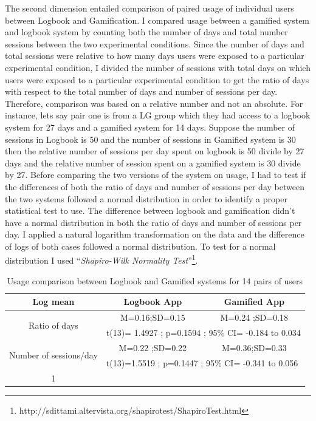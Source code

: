 The second dimension entailed comparison of paired usage of individual users between Logbook and Gamification. I compared usage between a gamified system and logbook system by counting both the number of days and total number sessions between the two experimental conditions. Since the number of days and total sessions were relative to how many days users were exposed to a particular experimental condition, I divided the number of sessions with total days on which users were exposed to a particular experimental condition to get the ratio of days with respect to the total number of days and number of sessions per day. Therefore, comparison was based on a relative number and not an absolute. For instance, lets say pair one is from a LG group which they had access to a logbook system for 27 days and a gamified system for 14 days. Suppose the number of sessions in Logbook is 50 and the number of sessions in Gamified system is 30 then the relative number of sessions per day spent on logbook is 50 divide by 27 days and the relative number of session spent on  a gamified system is 30 divide by 27. Before comparing the two versions of the system on usage, I had to test if the differences of both the ratio of days and number of sessions per day between the two systems followed a normal distribution in order to identify a proper statistical test to use. The difference between logbook and gamification didn't have a normal distribution in both the ratio of days and number of sessions per day. I applied a natural logarithm transformation on the data and the difference of logs of both cases followed a normal distribution. To test for a normal distribution I used ``\emph{Shapiro-Wilk Normality Test}''\footnote{http://sdittami.altervista.org/shapirotest/ShapiroTest.html}.
\newline 
\begin{table}[h!]
  \begin{center}
    \caption{Usage comparison between Logbook and Gamified systems for 14 pairs of users}
    \label{table:usagewellness1}
	\begin{tabular}{|c|c|c|}
		\hline
		Log mean &Logbook App&Gamified App\\
		\hline
		 \multirow{2}{*}{Ratio of days}&M=0.16;SD=0.15&M=0.24 ;SD=0.18\\\cline{2-3} 

		 &\multicolumn{2}{|l|}{t(13)= 1.4927 ; p=0.1594 ; 95\% CI= -0.184 to 0.034} \\
\hline
   		 \multirow{2}{*}{ Number of sessions/day}&M=0.22 ;SD=0.22&M=0.36;SD=0.33\\\cline{2-3} 
		
		 &\multicolumn{2}{|l|}{t(13)=1.5519 ; p=0.1447 ; 95\% CI= -0.341 to 0.056} \\
\hline1

	\end{tabular}
  \end{center}
\end{table}
\newline  
 
